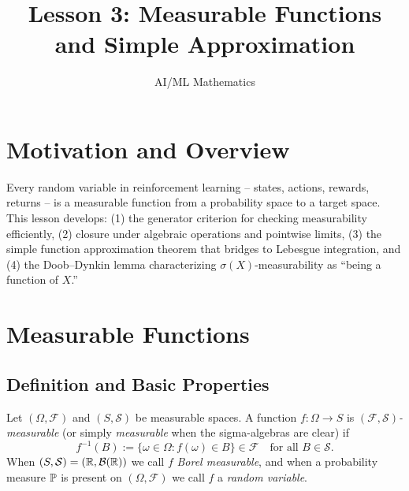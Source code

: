 \documentclass[11pt,a4paper]{article}
\title{Lesson 3: Measurable Functions and Simple Approximation}
\author{AI/ML Mathematics}
\date{}
\begin{document}
\maketitle
\tableofcontents
\newpage


\section{Motivation and Overview}
\label{sec:motivation}

Every random variable in reinforcement learning -- states, actions,
rewards, returns -- is a measurable function from a probability space to
a target space. This lesson develops: (1) the generator criterion for
checking measurability efficiently, (2) closure under algebraic operations
and pointwise limits, (3) the simple function approximation theorem that
bridges to Lebesgue integration, and (4) the Doob--Dynkin lemma
characterizing $\sigma(X)$-measurability as ``being a function of $X$.''


\section{Measurable Functions}
\label{sec:measurable}

\subsection{Definition and Basic Properties}
\label{subsec:meas_def}

\begin{definition}
\label{def:measurable_fn}
Let $(\Omega, \mathcal{F})$ and $(S, \mathcal{S})$ be measurable spaces. A
function $f: \Omega \to S$ is \emph{$(\mathcal{F}, \mathcal{S})$-measurable}
(or simply \emph{measurable} when the sigma-algebras are clear) if
\begin{equation}
  f^{-1}(B) := \{\omega \in \Omega : f(\omega) \in B\} \in \mathcal{F}
  \quad \text{for all } B \in \mathcal{S}.
  \label{eq:measurable_fn}
\end{equation}
When $(S, \mathcal{S}) = (\mathbb{R}, \mathcal{B}(\mathbb{R}))$ we call $f$
\emph{Borel measurable}, and when a probability measure $\mathbb{P}$ is present
on $(\Omega, \mathcal{F})$ we call $f$ a \emph{random variable}.
\end{definition}
\end{document}

